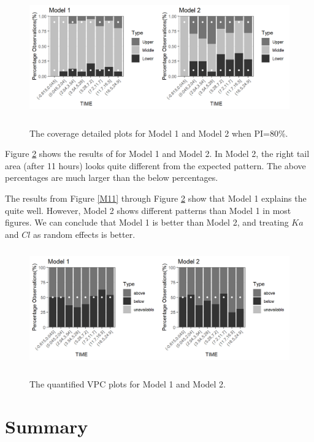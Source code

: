 \begin{figure}
\caption{The coverage detailed plots for Model 1 and Model 2 when PI=80\%.}
\centering
\includegraphics[width=5in,height=2in]{plotPNG/M17-1.png}
\label{M17}
\end{figure}

Figure \ref{M18} shows the results of  for Model 1 and Model 2. In Model 2, the right tail area (after 11 hours) looks quite different from the expected pattern. The above percentages are much larger than the below percentages.

The results from Figure \ref{M11} through Figure \ref{M18} show that Model 1 explains the  quite well. However, Model 2 shows different patterns than Model 1 in most figures. We can conclude that Model 1 is better than Model 2, and treating $Ka$ and $Cl$ as random effects is better.

\begin{figure}
\caption{The quantified VPC plots for Model 1 and Model 2.}
\centering
 \includegraphics[width=5in,height=2in]{plotPNG/M18-1.png}
\label{M18}
\end{figure}


\hypertarget{Summary}{%
\section{Summary}\label{Summary}}

